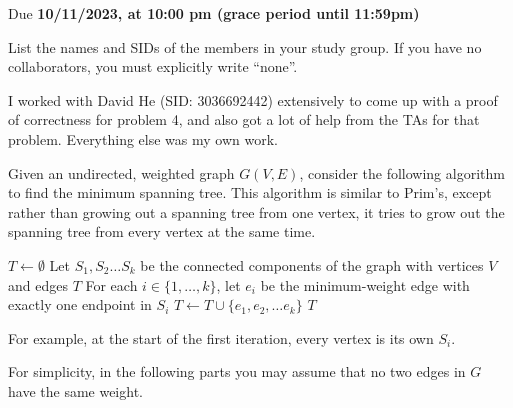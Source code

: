 \documentclass[11pt]{article}
\def\duedate{10/11/2023, at 10:00 pm (grace period until 11:59pm)}
\begin{document}
\maketitle


Due \textbf{\duedate}

List the names and SIDs of the members in your study group.
If you have no collaborators, you must explicitly write ``none''.

\begin{solution}
	I worked with David He (SID: 3036692442) extensively to come up with a proof of correctness for problem 4,
	and also got a lot of help from the TAs for that problem. Everything else was my own work. 
\end{solution}


Given an undirected, weighted graph $G(V, E)$, consider the following algorithm to find the minimum spanning tree. This algorithm is similar to Prim's, except rather than growing out a spanning tree from one vertex, it tries to grow out the spanning tree from every vertex at the same time.

\begin{algorithmic}[0]
		\State $T \leftarrow \emptyset$
			\State Let $S_1, S_2 \ldots S_k$ be the connected components of the graph with vertices $V$ and edges $T$
			\State For each $i \in \{1, \dots, k\}$, let $e_i$ be the minimum-weight edge with exactly one endpoint in $S_i$
			\State $T \leftarrow T \cup \{e_1, e_2, \ldots e_k\}$
		\EndWhile
		\State \Return $T$
	\EndProcedure
\end{algorithmic}

For example, at the start of the first iteration, every vertex is its own $S_i$.

For simplicity, in the following parts you may assume that no two edges in $G$ have the same weight.
\end{document}
